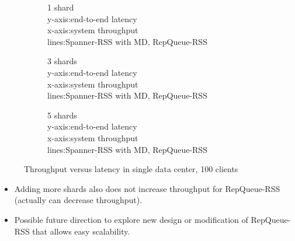 \documentclass[letterpaper, 11pt]{article}
\begin{document}
\begin{figure}[H]
  \centering
    \begin{subfigure}[t]{0.3\textwidth}
    \begin{tcolorbox}[width=\textwidth, sharp corners=all, frame empty]
      1 shard \\
    y-axis:end-to-end latency\\
    x-axis:system throughput \\
    lines:Spanner-RSS with MD, RepQueue-RSS
  \end{tcolorbox}
\end{subfigure}
\begin{subfigure}[t]{0.3\textwidth}
  \begin{tcolorbox}[width=\textwidth, sharp corners=all, frame empty]
     3 shards \\
    y-axis:end-to-end latency\\
    x-axis:system throughput \\
    lines:Spanner-RSS with MD, RepQueue-RSS
  \end{tcolorbox}
\end{subfigure}
\begin{subfigure}[t]{0.3\textwidth}
  \begin{tcolorbox}[width=\textwidth, sharp corners=all, frame empty]
     5 shards \\
    y-axis:end-to-end latency\\
    x-axis:system throughput \\
    lines:Spanner-RSS with MD, RepQueue-RSS
  \end{tcolorbox}
\end{subfigure}
  \caption{Throughput versus latency in single data center, 100 clients}
\end{figure}
\begin{itemize}
\item Adding more shards also does not increase throughput for RepQueue-RSS (actually can decrease throughput). 
\item Possible future direction to explore new design or modification of RepQueue-RSS that allows easy scalability.
\end{itemize}
\end{document}
